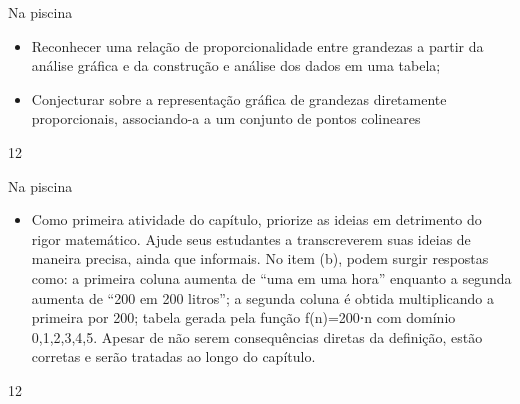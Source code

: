 \def\currentcolor{session1}
\clearmargin
\begin{objectives}{Na piscina}
{
\begin{itemize}
\item Reconhecer uma relação de proporcionalidade entre grandezas a partir da análise gráfica e da construção e análise dos dados em uma tabela;

\item Conjecturar sobre a representação gráfica de grandezas diretamente proporcionais, associando-a a um conjunto de pontos colineares
\end{itemize}
}{1}{2}
\end{objectives}
\begin{sugestions}{Na piscina}
{
\begin{itemize}
\item Como primeira atividade do capítulo, priorize as ideias em detrimento do rigor matemático. Ajude seus estudantes a transcreverem suas ideias de maneira precisa, ainda que informais.
No item (b), podem surgir respostas como: a primeira coluna aumenta de “uma em uma hora” enquanto a segunda aumenta de “200 em 200 litros”; a segunda coluna é obtida multiplicando a primeira por 200; tabela gerada pela função f(n)=200⋅n com domínio {0,1,2,3,4,5}. Apesar de não serem consequências diretas da definição, estão corretas e serão tratadas ao longo do capítulo.
\end{itemize}
}{1}{2}
\end{sugestions}
\clearmargin
